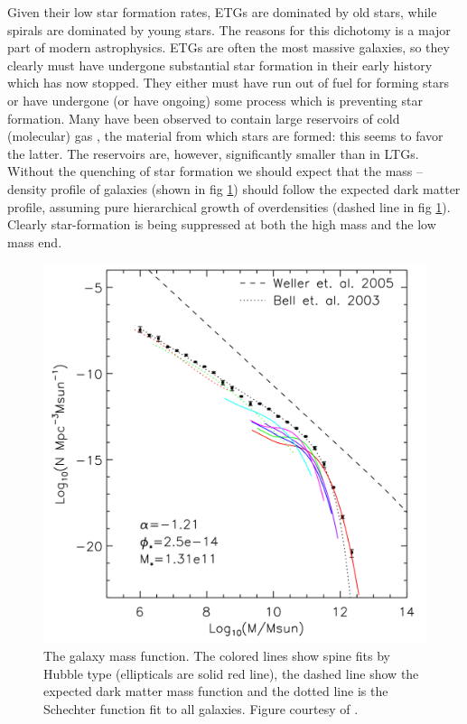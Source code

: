 Given their low star formation rates, ETGs are dominated by old stars, while spirals are dominated by young stars. The reasons for this dichotomy is a major part of modern astrophysics. ETGs are often the most massive galaxies, so they clearly must have undergone substantial star formation in their early history which has now stopped. They either must have run out of fuel for forming stars or have undergone (or have ongoing) some process which is preventing star formation. Many have been observed to contain large reservoirs of cold (molecular) gas \citep{}, the material from which stars are formed: this seems to favor the latter. The reservoirs are, however, significantly smaller than in LTGs. Without the quenching of star formation we should expect that the mass -- density profile of galaxies (shown in fig \ref{fig:massSuppression}) should follow the expected dark matter profile, assuming pure hierarchical growth of overdensities (dashed line in fig \ref{fig:massSuppression}). Clearly star-formation is being suppressed at both the high mass and the low mass end.

\begin{figure}
	\centering
	\includegraphics[width=\textwidth]{introduction/agnFeedback.png}
	\caption[Galaxy mass function]{The galaxy mass function. The colored lines show spine fits by Hubble type (ellipticals are solid red line), the dashed line show the expected dark matter mass function \citep{Weller2005} and the dotted line is the Schechter function fit to all galaxies. Figure courtesy of \citet{Read2005}.}
	\label{fig:massSuppression}
\end{figure}


